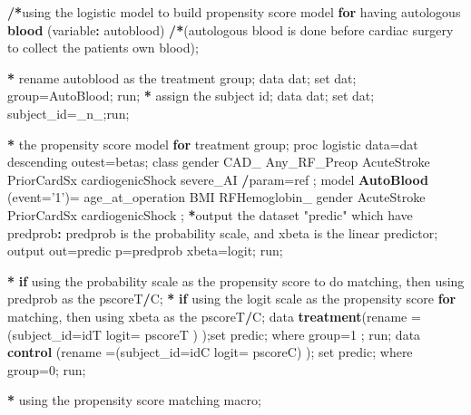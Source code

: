 \documentclass[]{article}
\newenvironment{Shaded}{\begin{snugshade}}{\end{snugshade}}
\newcommand{\KeywordTok}[1]{\textcolor[rgb]{0.13,0.29,0.53}{\textbf{#1}}}
\newcommand{\DataTypeTok}[1]{\textcolor[rgb]{0.13,0.29,0.53}{#1}}
\newcommand{\DecValTok}[1]{\textcolor[rgb]{0.00,0.00,0.81}{#1}}
\newcommand{\StringTok}[1]{\textcolor[rgb]{0.31,0.60,0.02}{#1}}
\newcommand{\ControlFlowTok}[1]{\textcolor[rgb]{0.13,0.29,0.53}{\textbf{#1}}}
\newcommand{\OperatorTok}[1]{\textcolor[rgb]{0.81,0.36,0.00}{\textbf{#1}}}
\newcommand{\ErrorTok}[1]{\textcolor[rgb]{0.64,0.00,0.00}{\textbf{#1}}}
\newcommand{\NormalTok}[1]{#1}
\begin{document}
\begin{Shaded}
\begin{Highlighting}[]
\OperatorTok{/}\ErrorTok{*}\NormalTok{using the logistic model to build propensity score model }\ControlFlowTok{for}\NormalTok{ having autologous }\KeywordTok{blood}\NormalTok{ (variable}\OperatorTok{:}\StringTok{ }\NormalTok{autoblood) }
\OperatorTok{/}\ErrorTok{*}\NormalTok{(autologous blood is done before cardiac surgery to collect the patients own blood); }

\OperatorTok{*}\StringTok{ }\NormalTok{rename autoblood as the treatment group; }
\NormalTok{data dat; set dat; group=AutoBlood; run;}
\OperatorTok{*}\StringTok{ }\NormalTok{assign the subject id; }
\NormalTok{data dat; set dat; subject_id=_n_;run;}


\OperatorTok{*}\StringTok{ }\NormalTok{the propensity score model }\ControlFlowTok{for}\NormalTok{ treatment group; }
\NormalTok{ proc logistic data=dat descending outest=betas; }
\NormalTok{   class  gender CAD_ Any_RF_Preop AcuteStroke PriorCardSx cardiogenicShock severe_AI }\OperatorTok{/}\NormalTok{param=ref ;}
\NormalTok{   model }\KeywordTok{AutoBlood}\NormalTok{ (}\DataTypeTok{event=}\StringTok{'1'}\NormalTok{)=}\StringTok{  }\NormalTok{age_at_operation  BMI RFHemoglobin_ gender AcuteStroke PriorCardSx cardiogenicShock    ; }
  \OperatorTok{*}\NormalTok{output the dataset }\StringTok{"predic"}\NormalTok{ which have predprob}\OperatorTok{:}\StringTok{ }\NormalTok{predprob is the probability scale, and xbeta is the linear predictor;}
\NormalTok{   output out=predic p=predprob xbeta=logit; }
\NormalTok{run;}

\OperatorTok{*}\StringTok{ }\ControlFlowTok{if}\NormalTok{ using the probability scale as the propensity score to do matching, then using predprob as the pscoreT}\OperatorTok{/}\NormalTok{C;}
\OperatorTok{*}\StringTok{ }\ControlFlowTok{if}\NormalTok{ using the logit scale as the propensity score }\ControlFlowTok{for}\NormalTok{ matching, then using xbeta as the pscoreT}\OperatorTok{/}\NormalTok{C; }
\NormalTok{data }\KeywordTok{treatment}\NormalTok{(}\DataTypeTok{rename =}\NormalTok{(}\DataTypeTok{subject_id=}\NormalTok{idT }\DataTypeTok{logit=}\NormalTok{ pscoreT  ) );set predic; where group=}\DecValTok{1}\NormalTok{ ; run;}
\NormalTok{data }\KeywordTok{control}\NormalTok{ (}\DataTypeTok{rename =}\NormalTok{(}\DataTypeTok{subject_id=}\NormalTok{idC }\DataTypeTok{logit=}\NormalTok{ pscoreC) ); set predic; where group=}\DecValTok{0}\NormalTok{; run;}

\OperatorTok{*}\StringTok{ }\NormalTok{using the propensity score matching macro; }
\NormalTok{%include }\StringTok{'xx\textbackslash{}propensity score matching macro\textbackslash{}psmatching.sas'}\NormalTok{;}

}
\end{Highlighting}
\end{Shaded}
\end{document}
